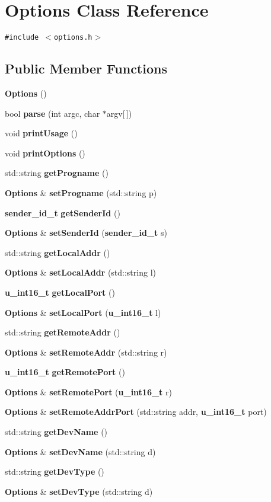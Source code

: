 \section{Options Class Reference}
\label{classOptions}
{\tt \#include $<$options.h$>$}

\subsection*{Public Member Functions}
\begin{CompactItemize}
\item 
{\bf Options} ()
\item 
bool {\bf parse} (int argc, char $\ast$argv[$\,$])
\item 
void {\bf print\-Usage} ()
\item 
void {\bf print\-Options} ()
\item 
std::string {\bf get\-Progname} ()
\item 
{\bf Options} \& {\bf set\-Progname} (std::string p)
\item 
{\bf sender\_\-id\_\-t} {\bf get\-Sender\-Id} ()
\item 
{\bf Options} \& {\bf set\-Sender\-Id} ({\bf sender\_\-id\_\-t} s)
\item 
std::string {\bf get\-Local\-Addr} ()
\item 
{\bf Options} \& {\bf set\-Local\-Addr} (std::string l)
\item 
{\bf u\_\-int16\_\-t} {\bf get\-Local\-Port} ()
\item 
{\bf Options} \& {\bf set\-Local\-Port} ({\bf u\_\-int16\_\-t} l)
\item 
std::string {\bf get\-Remote\-Addr} ()
\item 
{\bf Options} \& {\bf set\-Remote\-Addr} (std::string r)
\item 
{\bf u\_\-int16\_\-t} {\bf get\-Remote\-Port} ()
\item 
{\bf Options} \& {\bf set\-Remote\-Port} ({\bf u\_\-int16\_\-t} r)
\item 
{\bf Options} \& {\bf set\-Remote\-Addr\-Port} (std::string addr, {\bf u\_\-int16\_\-t} port)
\item 
std::string {\bf get\-Dev\-Name} ()
\item 
{\bf Options} \& {\bf set\-Dev\-Name} (std::string d)
\item 
std::string {\bf get\-Dev\-Type} ()
\item 
{\bf Options} \& {\bf set\-Dev\-Type} (std::string d)
\item 

\end{CompactItemize}
